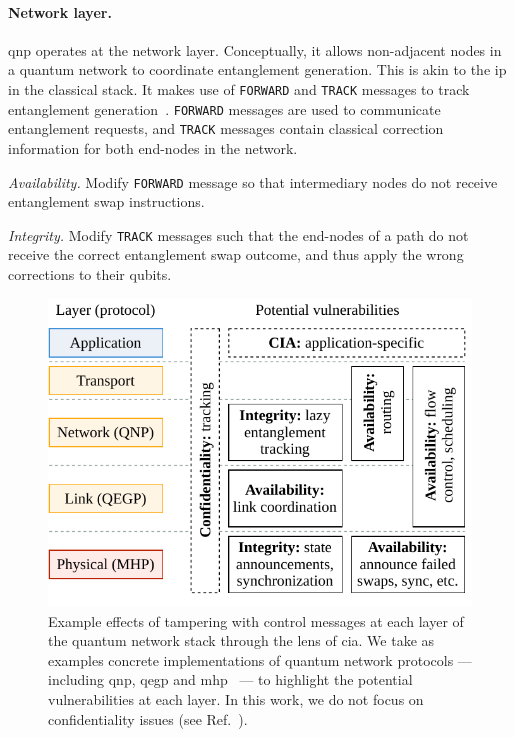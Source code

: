 \paragraph*{Network layer.}

\acrshort{qnp} operates at the network layer. Conceptually, it allows non-adjacent nodes in a
quantum network to coordinate entanglement generation. This is akin to the \acrfull{ip} in the
classical stack. It makes use of \texttt{FORWARD} and \texttt{TRACK} messages to track entanglement
generation~\cite[Figure 6]{kozlowski_2020_qnp}. \texttt{FORWARD} messages are used to communicate
entanglement requests, and \texttt{TRACK} messages contain classical correction information for both
end-nodes in the network.

\begin{example}
\textit{Availability.}
Modify \texttt{FORWARD} message so that intermediary nodes do not receive entanglement swap
instructions.
\end{example}

\begin{example}
\textit{Integrity.}
Modify \texttt{TRACK} messages such that the end-nodes of a path do not receive the correct
entanglement swap outcome, and thus apply the wrong corrections to their qubits.
\end{example}

\begin{figure}[t]
    \centering
    \includegraphics[width=0.6\linewidth]{figures/doa-examples.pdf}
    \caption{
        Example effects of tampering with control messages at each layer of the quantum network
        stack through the lens of \acrfull{cia}. We take as examples concrete implementations of
        quantum network protocols --- including \acrshort{qnp}, \acrshort{qegp} and
        \acrshort{mhp}~\cite{kozlowski_2020_qnp, dahlberg_2019_egp} --- to highlight the potential
        vulnerabilities at each layer. In this work, we do not focus on confidentiality issues (see
        Ref.~\cite{satoh_2020_attacking}).
    }
    \label{fig:doa-examples}
\end{figure}

